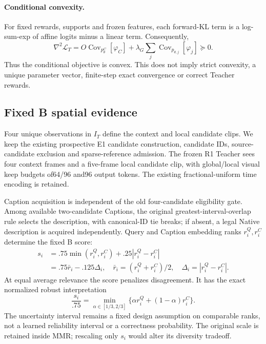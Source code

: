 \documentclass[11pt]{article}
\begin{document}
\paragraph{Conditional convexity.}
For fixed rewards, supports and frozen features, each forward-KL term is a log-sum-exp of affine logits minus a linear term. Consequently,
\begin{equation}
\nabla^2\mathcal L_T=O\operatorname{Cov}_{p^C_\theta}[\varphi_C]
 +\lambda_G\sum_j\operatorname{Cov}_{p_{\theta,j}}[\varphi_j]\succeq0.
\end{equation}
Thus the conditional objective is convex. This does not imply strict convexity, a unique parameter vector, finite-step exact convergence or correct Teacher rewards.

\subsection{Fixed B spatial evidence}
Four unique observations in $I_T$ define the context and local candidate clips. We keep the existing prospective E1 candidate construction, candidate IDs, source-candidate exclusion and sparse-reference admission. The frozen R1 Teacher sees four context frames and a five-frame local candidate clip, with global/local visual keep budgets of64/96 and96 output tokens. The existing fractional-uniform time encoding is retained.

Caption acquisition is independent of the old four-candidate eligibility gate. Among available two-candidate Captions, the original greatest-interval-overlap rule selects the description, with canonical-ID tie breaks; if absent, a legal Native description is acquired independently. Query and Caption embedding ranks $r_i^Q,r_i^C$ determine the fixed B score:
\begin{align}
s_i&=.75\min(r_i^Q,r_i^C)+.25|r_i^Q-r_i^C|\\
&=.75\bar r_i-.125\Delta_i,\quad
\bar r_i=(r_i^Q+r_i^C)/2,\quad\Delta_i=|r_i^Q-r_i^C|.
\end{align}
At equal average relevance the score penalizes disagreement. It has the exact normalized robust interpretation
\begin{equation}
\frac{s_i}{.75}=\min_{\alpha\in[1/3,2/3]}\{\alpha r_i^Q+(1-\alpha)r_i^C\}.
\end{equation}
The uncertainty interval remains a fixed design assumption on comparable ranks, not a learned reliability interval or a correctness probability. The original scale is retained inside MMR; rescaling only $s_i$ would alter its diversity tradeoff.
\end{document}
